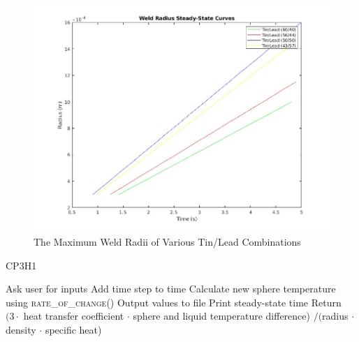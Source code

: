 \documentclass[letterpaper,11pt]{texMemo} %
\begin{document}
\begin{figure}[H]
  \centering
  \includegraphics[width=.9\textwidth]{WeldRadius.jpg}
  \caption{The Maximum Weld Radii of Various Tin/Lead Combinations}
  \label{fig:3}
\end{figure}

\begin{algorithm}[H]
      \caption{CP3H1}\label{1}
      \begin{algorithmic}[1]
        \State Ask user for inputs
        \Do 
            \State Add time step to time
            \State Calculate new sphere temperature using \textsc{rate\_of\_change()}
            \State Output values to file
        \State Print steady-state time
    \State Return $(3\cdot$ heat transfer coefficient $\cdot$ sphere and liquid temperature difference) $ / ($radius $\cdot$ density $\cdot$ specific heat)
      \end{algorithmic}
\end{algorithm}
\end{document}
